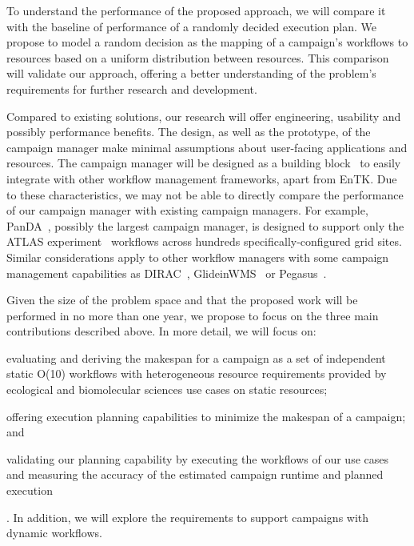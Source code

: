 To understand the performance of the proposed approach, we will compare it with 
the baseline of performance of a randomly decided execution plan. We propose to 
model a random decision as the mapping of a campaign’s workflows to resources 
based on a uniform distribution between resources. This comparison will validate 
our approach, offering a better understanding of the problem’s requirements for 
further research and development.

Compared to existing solutions, our research will offer engineering, usability 
and possibly performance benefits. The design, as well as the prototype, of the 
campaign manager make minimal assumptions about user-facing applications and  resources. The campaign manager will be designed as a building 
block~\cite{turilli2019middleware} to easily integrate with other workflow 
management frameworks, apart from EnTK. Due to these characteristics, we may 
not be able to directly compare the performance of our campaign manager with 
existing campaign managers. For example, PanDA~\cite{maeno2008panda}, possibly 
the largest campaign manager, is designed to support only the ATLAS 
experiment~\cite{atlas} workflows across hundreds specifically-configured 
grid sites. Similar considerations apply to other workflow managers with 
some campaign management capabilities as DIRAC~\cite{casajus2010dirac}, 
GlideinWMS~\cite{sfiligoi2008glidein} or Pegasus~\cite{deelman2015pegasus}.

Given the size of the problem space and that the proposed work will be performed 
in no more than one year, we propose to focus on the three main contributions described above. In more detail, we will focus on: 
\begin{inparaenum}[(1)]
\item evaluating and deriving the makespan for a campaign as a set of independent 
static O(10) workflows with heterogeneous resource requirements provided by 
ecological and biomolecular sciences use cases on static resources; 
\item offering execution planning capabilities to minimize the makespan of a 
campaign; and 
\item validating our planning capability by executing the workflows of our use 
cases and measuring the accuracy of the estimated campaign runtime and planned 
execution
\end{inparaenum}. In addition, we will explore the requirements to support 
campaigns with dynamic workflows.

